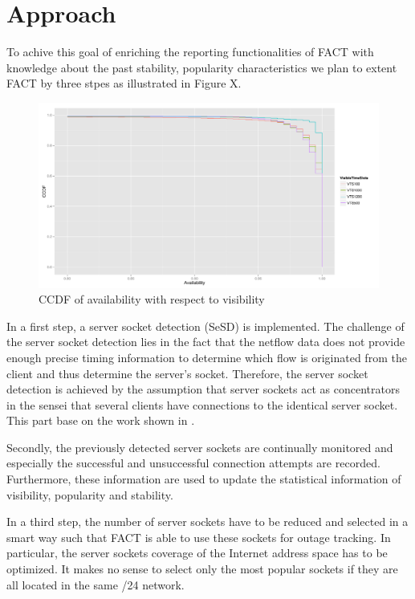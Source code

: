 \documentclass{sigcomm-alternate}
\begin{document}
\section{Approach}
To achive this goal of enriching the reporting functionalities of FACT
with knowledge about the past stability, popularity characteristics
we plan to extent FACT by three stpes as illustrated in Figure X.

\begin{figure}[ht!]
\centering \includegraphics[width=18cm]{images/RATIO_VTS_External.pdf}
\caption{CCDF of availability with respect to visibility}
\label{fig:RatioVTS} 
\end{figure}

In a first step, a server socket detection (SeSD) is implemented. The
challenge of the server socket detection lies in the fact that the
netflow data does not provide enough precise timing information to
determine which flow is originated from the client and thus determine
the server's socket. Therefore, the server socket detection is
achieved by the assumption that server sockets act as concentrators
in the sensei that several clients have connections to the identical
server socket. This part base on the work shown in \cite{TechReport}.

Secondly, the previously detected server sockets are continually
monitored and especially the successful and unsuccessful connection
attempts are recorded. Furthermore, these information are used to update
the statistical information of visibility, popularity and stability.

In a third step, the number of server sockets have to be reduced and
selected in a smart way such that FACT is able to use these sockets
for outage tracking. In particular, the server sockets coverage of the
Internet address space has to be optimized. It makes no sense to select
only the most popular sockets if they are all located in the same /24
network.
\end{document}
